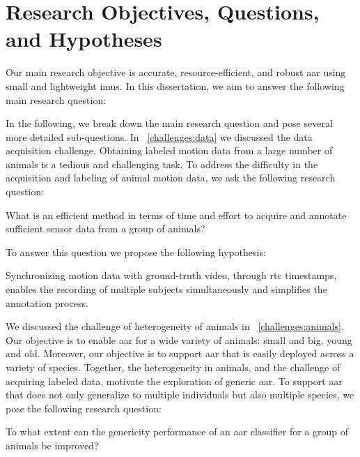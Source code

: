 \section{Research Objectives, Questions, and Hypotheses}
\label{sec:intro_research_objective}

Our main research objective is accurate, resource-efficient, and robust \gls{aar} using small and lightweight \glspl{imu}.
In this dissertation, we aim to answer the following main research question:

\mainrq

In the following, we break down the main research question and pose several more detailed sub-questions.
In \sectionname~\ref{challenges:data} we discussed the data acquisition challenge.
Obtaining labeled motion data from a large number of animals is a tedious and challenging task.
To address the difficulty in the acquisition and labeling of animal motion data, we ask the following research question:

\begin{ResearchQuestion}
\label{rq:labeling}
What is an efficient method in terms of time and effort to acquire and annotate sufficient sensor data from a group of animals?
\end{ResearchQuestion}

To answer this question we propose the following hypothesis:

\begin{hypothesis}
\label{hyp:labeling}
    Synchronizing motion data with ground-truth video, through \gls{rtc} timestamps, enables the recording of multiple subjects simultaneously and simplifies the annotation process. 
\end{hypothesis}



We discussed the challenge of heterogeneity of animals in \sectionname~\ref{challenges:animals}.
Our objective is to enable \gls{aar} for a wide variety of animals: small and big, young and old.
Moreover, our objective is to support \gls{aar} that is easily deployed across a variety of species.
Together, the heterogeneity in animals, and the challenge of acquiring labeled data, motivate the exploration of generic \gls{aar}. 
To support \gls{aar} that does not only generalize to multiple individuals but also multiple species, we pose the following research question:

\begin{ResearchQuestion}
\label{rq:generic}
    To what extent can the genericity performance of an \gls{aar} classifier for a group of animals be improved?
    
\end{ResearchQuestion}

